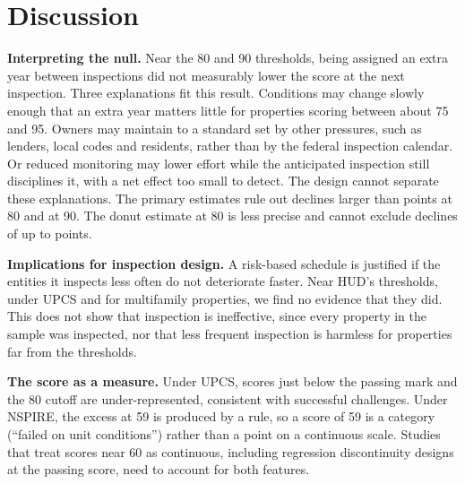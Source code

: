 \documentclass[10pt,twocolumn,letterpaper]{article}
\newcommand{\runhead}[1]{\par\vspace{0.35ex}\noindent\textbf{#1}\hspace{0.35em}}
\begin{document}
\section{Discussion}\label{sec:discussion}
\runhead{Interpreting the null.} Near the 80 and 90 thresholds, being assigned an extra year between inspections did not measurably lower the score at the next inspection. Three explanations fit this result. Conditions may change slowly enough that an extra year matters little for properties scoring between about 75 and 95. Owners may maintain to a standard set by other pressures, such as lenders, local codes and residents, rather than by the federal inspection calendar. Or reduced monitoring may lower effort while the anticipated inspection still disciplines it, with a net effect too small to detect. The design cannot separate these explanations. The primary estimates rule out declines larger than \ciLoEighty{} points at 80 and \ciLoNinety{} at 90. The donut estimate at 80 is less precise and cannot exclude declines of up to \robDonutOneCiLoEighty{} points.

\runhead{Implications for inspection design.} A risk-based schedule is justified if the entities it inspects less often do not deteriorate faster. Near HUD's thresholds, under UPCS and for multifamily properties, we find no evidence that they did. This does not show that inspection is ineffective, since every property in the sample was inspected, nor that less frequent inspection is harmless for properties far from the thresholds.

\runhead{The score as a measure.} Under UPCS, scores just below the passing mark and the 80 cutoff are under-represented, consistent with successful challenges. Under NSPIRE, the excess at 59 is produced by a rule, so a score of 59 is a category (``failed on unit conditions'') rather than a point on a continuous scale. Studies that treat scores near 60 as continuous, including regression discontinuity designs at the passing score, need to account for both features.
\end{document}
